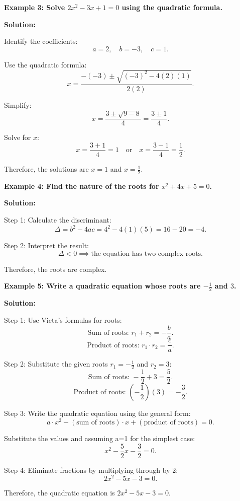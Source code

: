 \begin{flushleft}
\textbf{Example 3: Solve $2x^2 - 3x + 1 = 0$ using the quadratic formula.}

\vspace{0.5cm}
\textbf{Solution:}
\vspace{0.5cm}

Identify the coefficients:
\[
a = 2, \quad b = -3, \quad c = 1.
\]

Use the quadratic formula:
\[
x = \frac{-(-3) \pm \sqrt{(-3)^2 - 4(2)(1)}}{2(2)}.
\]

Simplify:
\[
x = \frac{3 \pm \sqrt{9 - 8}}{4} = \frac{3 \pm 1}{4}.
\]

Solve for $x$:
\[
x = \frac{3 + 1}{4} = 1 \quad \text{or} \quad x = \frac{3 - 1}{4} = \frac{1}{2}.
\]

Therefore, the solutions are $x = 1$ and $x = \frac{1}{2}$.
\end{flushleft}

\begin{flushleft}
\textbf{Example 4: Find the nature of the roots for $x^2 + 4x + 5 = 0$.}

\vspace{0.5cm}
\textbf{Solution:}
\vspace{0.5cm}

Step 1: Calculate the discriminant:
\[
\Delta = b^2 - 4ac = 4^2 - 4(1)(5) = 16 - 20 = -4.
\]

Step 2: Interpret the result:
\[
\Delta < 0 \implies \text{the equation has two complex roots.}
\]

Therefore, the roots are complex.
\end{flushleft}

\begin{flushleft}
\textbf{Example 5: Write a quadratic equation whose roots are $-\frac{1}{2}$ and $3$.}

\vspace{0.5cm}
\textbf{Solution:}
\vspace{0.5cm}

Step 1: Use Vieta's formulas for roots:
\[
\text{Sum of roots: } r_1 + r_2 = -\frac{b}{a}.
\]
\[
\text{Product of roots: } r_1 \cdot r_2 = \frac{c}{a}.
\]

Step 2: Substitute the given roots $r_1 = -\frac{1}{2}$ and $r_2 = 3$:
\[
\text{Sum of roots: } -\frac{1}{2} + 3 = \frac{5}{2}.
\]
\[
\text{Product of roots: } \left(-\frac{1}{2}\right)(3) = -\frac{3}{2}.
\]

Step 3: Write the quadratic equation using the general form:
\[
a \cdot x^2 - (\text{sum of roots}) \cdot x + (\text{product of roots}) = 0.
\]

Substitute the values and assuming a=1 for the simplest case:
\[
x^2 - \frac{5}{2}x - \frac{3}{2} = 0.
\]

Step 4: Eliminate fractions by multiplying through by 2:
\[
2x^2 - 5x - 3 = 0.
\]

Therefore, the quadratic equation is $2x^2 - 5x - 3 = 0$.
\end{flushleft}

